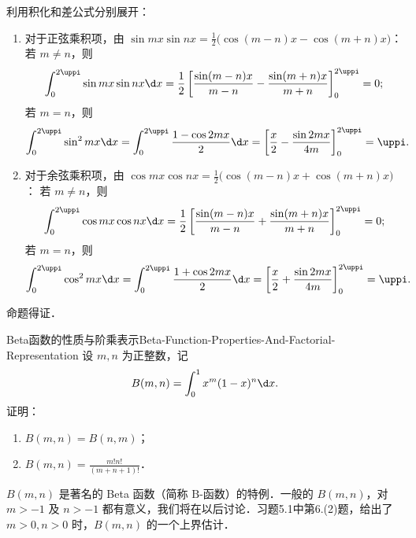 \begin{myproof}
    利用积化和差公式分别展开：
    \begin{enumerate}
        \item 对于正弦乘积项，由 $\sin mx \sin nx = \frac{1}{2}\bigl(\cos(m-n)x - \cos(m+n)x\bigr)$：
              若 $m \neq n$，则
              \begin{equation}
                  \int_0^{2\uppi} \sin mx \sin nx \d x = \frac{1}{2} \left[ \frac{\sin(m-n)x}{m-n} - \frac{\sin(m+n)x}{m+n} \right]_0^{2\uppi} = 0;
              \end{equation}
              若 $m = n$，则
              \begin{equation}
                  \int_0^{2\uppi} \sin^2 mx \d x = \int_0^{2\uppi} \frac{1 - \cos 2mx}{2} \d x = \left[ \frac{x}{2} - \frac{\sin 2mx}{4m} \right]_0^{2\uppi} = \uppi.
              \end{equation}
        \item 对于余弦乘积项，由 $\cos mx \cos nx = \frac{1}{2}\bigl(\cos(m-n)x + \cos(m+n)x\bigr)$：
              若 $m \neq n$，则
              \begin{equation}
                  \int_0^{2\uppi} \cos mx \cos nx \d x = \frac{1}{2} \left[ \frac{\sin(m-n)x}{m-n} + \frac{\sin(m+n)x}{m+n} \right]_0^{2\uppi} = 0;
              \end{equation}
              若 $m = n$，则
              \begin{equation}
                  \int_0^{2\uppi} \cos^2 mx \d x = \int_0^{2\uppi} \frac{1 + \cos 2mx}{2} \d x = \left[ \frac{x}{2} + \frac{\sin 2mx}{4m} \right]_0^{2\uppi} = \uppi.
              \end{equation}
    \end{enumerate}
    命题得证．
\end{myproof}

\begin{problem}{Beta函数的性质与阶乘表示}{Beta-Function-Properties-And-Factorial-Representation}
    设 $m, n$ 为正整数，记
    \begin{equation}
        B(m, n) = \int_0^1 x^m (1 - x)^n \d x.
    \end{equation}
    证明：
    \begin{enumerate}
        \item $B(m, n) = B(n, m)$；
        \item $B(m, n) = \frac{m!n!}{(m+n+1)!}$．
    \end{enumerate}
    $B(m, n)$ 是著名的 Beta 函数（简称 $\text{B}$-函数）的特例．一般的 $B(m, n)$，对 $m > -1$ 及 $n > -1$ 都有意义，我们将在以后讨论．习题5.1中第6.(2)题，给出了 $m > 0, n > 0$ 时，$B(m, n)$ 的一个上界估计．
\end{problem}

